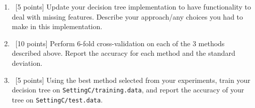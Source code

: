 \begin{enumerate}

  
\item ~[5 points] Update your decision tree implementation to have functionality to deal with missing features. Describe your approach/any choices you had to make in this implementation. 
  
\item ~[10 points] Perform 6-fold cross-validation on each of the 3 methods described above. Report the accuracy for each method and the standard deviation. 
  
\item ~[5 points] Using the best method selected from your experiments, train your decision tree on \texttt{SettingC/training.data}, and report the accuracy of your tree on \texttt{SettingC/test.data}. 
\end{enumerate}





